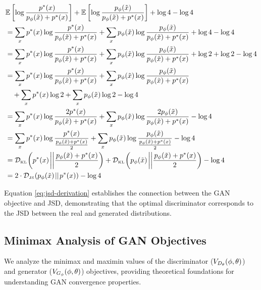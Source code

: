 \begin{small}
  \begin{align}
    & \mathbb{E}\left[\log{{\ptx \over \pgx + \ptx}}\right] + \mathbb{E}\left[\log{\pgx\over\pgx + \ptx}\right] + \log4 - \log4 \nonumber \\
    & = \sum_{x}\ptx\log{\ptx \over \pgx + \ptx} + \sum_{x}\pgx\log{\pgx \over \pgx + \ptx} + \log4 - \log4 \nonumber \\
    & = \sum_{x}\ptx\log{\ptx \over \pgx + \ptx} + \sum_{x}\pgx\log{\pgx \over \pgx + \ptx} + \log2 + \log2 - \log4 \nonumber \\
    & = \sum_{x}\ptx\log{\ptx \over \pgx + \ptx} + \sum_{x}\pgx\log{\pgx
      \over \pgx + \ptx} \nonumber \\
    & \quad + \sum_{x}\ptx\log2 + \sum_{x}\pgx\log2 - \log4 \nonumber \\
    & = \sum_{x}\ptx\log{2\ptx \over \pgx + \ptx} + \sum_{x}\pgx\log{2\pgx \over \pgx + \ptx} - \log4 \nonumber \\
    & = \sum_{x}\ptx\log{\ptx \over {\pgx + \ptx \over 2}} + \sum_{x}\pgx\log{\pgx \over {\pgx + \ptx \over 2}} - \log4 \nonumber \\
    & = \KL{\ptx}{\pgx + \ptx \over 2} + \KL{\pgx}{\pgx+\ptx \over 2} - \log4 \nonumber \\
    & = 2 \cdot \JSD{\pgx}{\ptx} - \log4 \label{eq:jsd-derivation}
  \end{align}
\end{small}

Equation \ref{eq:jsd-derivation} establishes the connection between the GAN objective and JSD, demonstrating that the optimal discriminator corresponds to the JSD between the real and generated distributions.

\subsection{Minimax Analysis of GAN Objectives}
\label{sec:minimax-analysis}
We analyze the minimax and maximin values of the discriminator ($V_{D_\theta}(\phi, \theta)$) and generator ($V_{G_\phi}(\phi, \theta)$) objectives, providing theoretical foundations for understanding GAN convergence properties.

